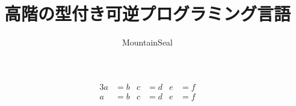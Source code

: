 \documentclass[a4j, dvipdfmx]{jsarticle}
\title{高階の型付き可逆プログラミング言語}
\date{}
\author{MountainSeal}
\theoremstyle{definition}
\newenvironment{bprooftree}
                {\leavevmode\hbox\bgroup}
                {\DisplayProof\egroup}
\newcommand{\lnlsequent}[3]{#1 \mid #2 \;\vdash\; #3}
\begin{document}
\maketitle
\thispagestyle{fancy}

\begin{figure}[H]
  \begin{alignat*}{3}
    a &= b & c &= d & e &= f \\
    a &= b & c &= d & e &= f
  \end{alignat*}
\end{figure}


\end{document}
